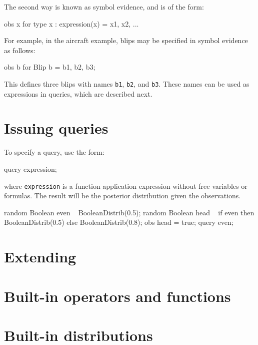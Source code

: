 \documentclass[12pt]{article}
\begin{document}
The second way is known as symbol evidence, and is of the form:
\begin{blogcode}
obs {x for type x : expression(x)} = { x1, x2, ...}
\end{blogcode}

For example, in the aircraft example, blips may be specified in symbol evidence as follows:
\begin{blogcode}
obs {b for Blip b} = {b1, b2, b3};
\end{blogcode}
This defines three blips with names \texttt{b1}, \texttt{b2}, and \texttt{b3}.  These names can be used as expressions in queries, which are described next.

\section{Issuing queries}\label{query-section}
To specify a query, use the form:
\begin{blogcode}
query expression;
\end{blogcode}
where \texttt{expression} is a function application expression without free variables or formulas. The result will be the posterior distribution given the observations. 

\begin{blogcode}
random Boolean even ~ BooleanDistrib(0.5);
random Boolean head ~
  if even then BooleanDistrib(0.5)
  else BooleanDistrib(0.8);
obs head = true;
query even;
\end{blogcode}



\section{Extending \bl}\label{extending-section}


\section{Built-in operators and functions}\label{builtin-operator-appendix}


\section{Built-in distributions}\label{builtin-distribution-appendix}

\end{document}
